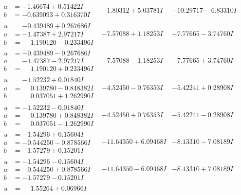 \documentclass[1p]{elsarticle_modified}
\theoremstyle{definition}
\begin{document}
$$\begin{array}{c|c|c}
\begin{aligned}
a &= -1.46674 + 0.51422 I \\
b &= -0.639093 + 0.316370 I\end{aligned}
 & -1.80312 + 5.03781 I & -10.29717 - 6.83310 I \\ \hline\begin{aligned}
u &= -0.439489 + 0.267686 I \\
a &= -1.47387 + 2.97217 I \\
b &= \phantom{-}1.190120 - 0.233496 I\end{aligned}
 & -7.57088 + 1.18253 I & -7.77665 - 3.74760 I \\ \hline\begin{aligned}
u &= -0.439489 - 0.267686 I \\
a &= -1.47387 - 2.97217 I \\
b &= \phantom{-}1.190120 + 0.233496 I\end{aligned}
 & -7.57088 - 1.18253 I & -7.77665 + 3.74760 I \\ \hline\begin{aligned}
u &= -1.52232 + 0.01840 I \\
a &= \phantom{-}0.139780 - 0.848382 I \\
b &= \phantom{-}0.037051 + 1.262990 I\end{aligned}
 & -4.52450 - 0.76353 I & -5.42241 + 0.28908 I \\ \hline\begin{aligned}
u &= -1.52232 - 0.01840 I \\
a &= \phantom{-}0.139780 + 0.848382 I \\
b &= \phantom{-}0.037051 - 1.262990 I\end{aligned}
 & -4.52450 + 0.76353 I & -5.42241 - 0.28908 I \\ \hline\begin{aligned}
u &= -1.54296 + 0.15604 I \\
a &= -0.544250 - 0.878566 I \\
b &= -1.57279 + 0.15201 I\end{aligned}
 & -11.64350 + 6.09468 I & -8.13310 - 7.08189 I \\ \hline\begin{aligned}
u &= -1.54296 - 0.15604 I \\
a &= -0.544250 + 0.878566 I \\
b &= -1.57279 - 0.15201 I\end{aligned}
 & -11.64350 - 6.09468 I & -8.13310 + 7.08189 I \\ \hline\begin{aligned}
u &= \phantom{-}1.55264 + 0.06966 I \\

\end{aligned}
\end{array}$$
\end{document}
